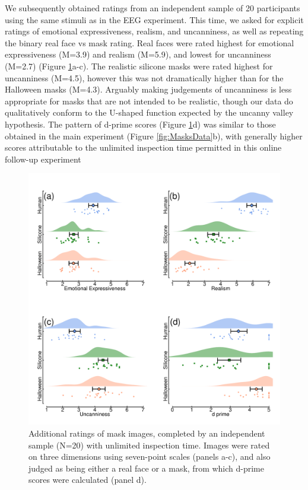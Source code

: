 \documentclass[
]{article}
\begin{document}
We subsequently obtained ratings from an independent sample of 20 participants using the same stimuli as in the EEG experiment. This time, we asked for explicit ratings of emotional expressiveness, realism, and uncanniness, as well as repeating the binary real face vs mask rating. Real faces were rated highest for emotional expressiveness (M=3.9) and realism (M=5.9), and lowest for uncanniness (M=2.7) (Figure \ref{fig:maskratings}a-c). The realistic silicone masks were rated highest for uncanniness (M=4.5), however this was not dramatically higher than for the Halloween masks (M=4.3). Arguably making judgements of uncanniness is less appropriate for masks that are not intended to be realistic, though our data do qualitatively conform to the U-shaped function expected by the uncanny valley hypothesis. The pattern of d-prime scores (Figure \ref{fig:maskratings}d) was similar to those obtained in the main experiment (Figure \ref{fig:MasksData}b), with generally higher scores attributable to the unlimited inspection time permitted in this online follow-up experiment

\begin{figure}

{\centering \includegraphics[width=0.7\linewidth]{Figures/MaskRatings} 

}

\caption{Additional ratings of mask images, completed by an independent sample (N=20) with unlimited inspection time. Images were rated on three dimensions using seven-point scales (panels a-c), and also judged as being either a real face or a mask, from which d-prime scores were calculated (panel d).}\label{fig:maskratings}
\end{figure}
\end{document}
